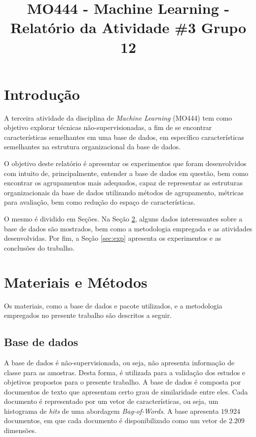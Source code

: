 \documentclass[conference]{IEEEtran}
\begin{document}
\title{MO444 - Machine Learning - Relatório da Atividade \#3 Grupo 12}

\author{
\and
{}
}

\maketitle

\section{Introdução}

A terceira atividade da disciplina de \textit{Machine Learning} (MO444) tem como objetivo explorar técnicas não-supervisionadas, a fim de se encontrar características semelhantes em uma base de dados, em específico características semelhantes na estrutura organizacional da base de dados.

O objetivo deste relatório é apresentar os experimentos que foram desenvolvidos com intuito de, principalmente, entender a base de dados em questão, bem como encontrar os agrupamentos mais adequados, capaz de representar as estruturas organizacionais da base de dados utilizando métodos de agrupamento, métricas para avaliação, bem como redução do espaço de características.

O mesmo é dividido em Seções. Na Seção \ref{sec:meto}, alguns dados interessantes sobre a base de dados são mostrados, bem como a metodologia empregada e as atividades desenvolvidas. Por fim, a Seção \ref{sec:exp} apresenta os experimentos e as conclusões do trabalho.

\section{Materiais e Métodos} \label{sec:meto}

Os materiais, como a base de dados e pacote utilizados, e a metodologia empregados no presente trabalho são descritos a seguir.

\subsection{Base de dados} \label{sec:base}

A base de dados é não-supervisionada, ou seja, não apresenta informação de classe para as amostras. Desta forma, é utilizada para a validação dos estudos e objetivos propostos para o presente trabalho. A base de dados é composta por documentos de texto que apresentam certo grau de similaridade entre eles. Cada documento é representado por um vetor de características, ou seja, um histograma de \emph{hits} de uma abordagem \emph{Bag-of-Words}. A base apresenta $19.924$ documentos, em que cada documento é disponibilizado como um vetor de $2.209$ dimensões.
\end{document}
